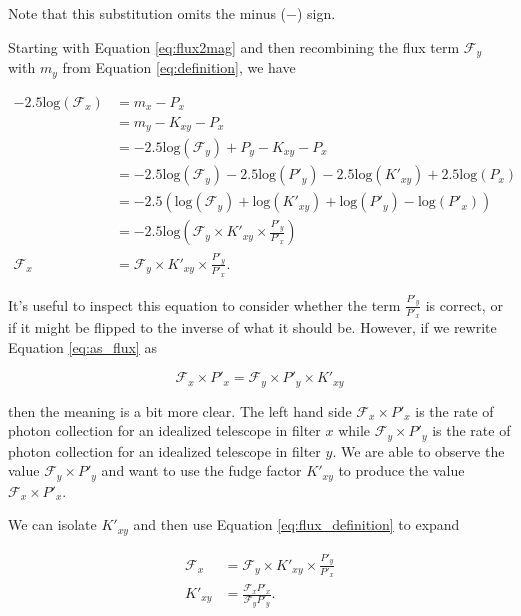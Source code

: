 \documentclass{article}
\begin{document}
Note that this substitution omits the minus ($-$) sign.

Starting with Equation \ref{eq:flux2mag} and then
recombining the flux term $\mathcal{F}_y$ with $m_y$ from Equation
\ref{eq:definition}, we have

\begin{equation}
\begin{aligned}
\label{eq:as_flux}
  -2.5 \text{log}(\mathcal{F}_x)
      &= m_x - P_x \\
      &= m_y - K_{xy} - P_x \\
      &= -2.5 \text{log}(\mathcal{F}_y) + P_y - K_{xy} - P_x \\
      &= -2.5 \text{log}(\mathcal{F}_y)
         - 2.5 \text{log}(P'_y)
         - 2.5 \text{log}(K'_{xy})
         + 2.5 \text{log}(P_x) \\
      &= -2.5 \left(
         \text{log}(\mathcal{F}_y)
         + \text{log}(K'_{xy})
         + \text{log}(P'_y)
         - \text{log}(P'_x)
        \right) \\
      &= -2.5 \text{log}\left(
        \mathcal{F}_y
        \times K'_{xy}
        \times \frac{P'_y}{P'_x}\right) \\
  \mathcal{F}_x &= \mathcal{F}_y \times K'_{xy} \times \frac{P'_y}{P'_x}.
\end{aligned}
\end{equation}

It's useful to inspect this equation to consider whether the term
$\frac{P'_y}{P'_x}$ is correct, or if it might be flipped to the inverse of
what it should be. However, if we rewrite Equation \ref{eq:as_flux} as

\begin{equation}
  \mathcal{F}_x \times P'_x = \mathcal{F}_y \times P'_y \times K'_{xy}
\end{equation}

then the meaning is a bit more clear. The left hand side
$\mathcal{F}_x \times P'_x$ is the rate of photon collection for an idealized
telescope in filter $x$ while $\mathcal{F}_y \times P'_y$ is the rate of photon
collection for an idealized telescope in filter $y$. We are able to observe the
value $\mathcal{F}_y \times P'_y$ and want to use the fudge factor $K'_{xy}$ to
produce the value $\mathcal{F}_x \times P'_x$.

We can isolate $K'_{xy}$ and then use Equation \ref{eq:flux_definition} to expand

\begin{equation}
\begin{aligned}
  \mathcal{F}_x &= \mathcal{F}_y \times K'_{xy} \times \frac{P'_y}{P'_x} \\
        K'_{xy} &= \frac{\mathcal{F}_x P'_x}{\mathcal{F}_y P'_y} .
\end{aligned}
\end{equation}
\end{document}
